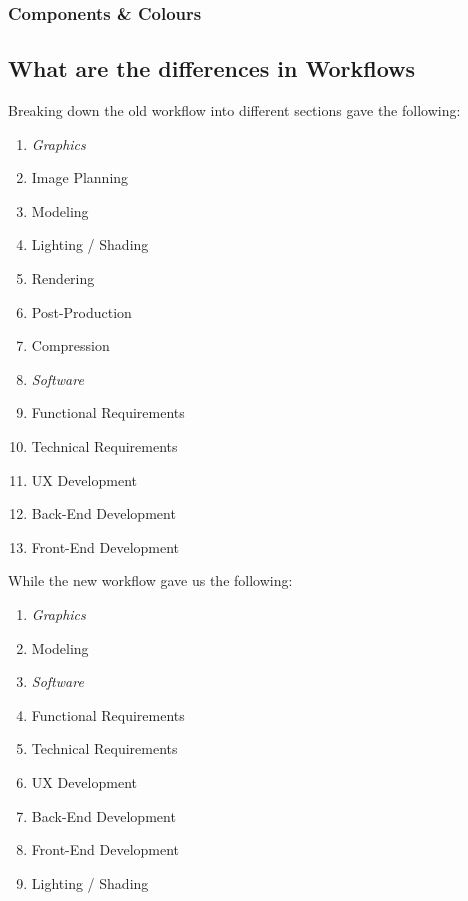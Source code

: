 \subsubsection{Components & Colours}

\subsection {What are the differences in Workflows}
\label{subsub:differencesInWorkflow}
Breaking down the old workflow into different sections gave the following:
\begin{enumerate}
	\item {\textit{Graphics}}
	\item {Image Planning}
	\item {Modeling}
	\item {Lighting / Shading}
	\item {Rendering}
	\item {Post-Production}
	\item {Compression}
	\item {\textit{Software}}
	\item {Functional Requirements}
	\item {Technical Requirements}
	\item {UX Development}
	\item {Back-End Development}
	\item {Front-End Development}
\end{enumerate}

While the new workflow gave us the following:
\begin{enumerate}
	\item {\textit{Graphics}}
	\item {Modeling}
	\item {\textit{Software}}
	\item {Functional Requirements}
	\item {Technical Requirements}
	\item {UX Development}
	\item {Back-End Development}
	\item {Front-End Development}
	\item {Lighting / Shading}
\end{enumerate}

